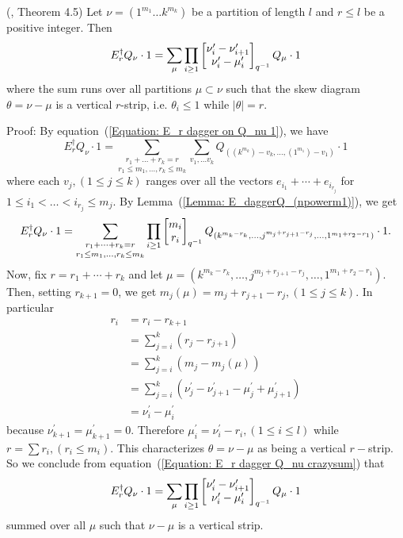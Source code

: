 \begin{dang}
    \begin{theorem}(\cite{jing2024characters}, Theorem 4.5)\label{Theorem: E_r dagger Q_nu explicit formula}
        Let $\nu=(1^{m_1}\dots k^{m_k})$ be a partition of length $l$ and $r\leq l$ be a positive integer. Then
        \begin{equation}
            E_r^\dagger Q_\nu\cdot1=\sum_{\mu}\prod_{i\geq1}\begin{bmatrix} \nu_i^\prime-\nu_{i+1}^\prime\\\nu_i^\prime-\mu_i^\prime\end{bmatrix}_{q^{-1}}Q_\mu\cdot1
        \end{equation}
        where the sum runs over all partitions $\mu\subset \nu$ such that the skew diagram $\theta=\nu-\mu$ is a vertical $r$-strip, i.e. $\theta_i\leq1$ while $|\theta|=r$.
    \end{theorem}
\end{dang}
Proof: By equation~(\ref{Equation: E_r dagger on Q_nu 1}), we have
\begin{equation}
        E_r^\dagger Q_\nu\cdot1 = \underset{r_1\leq m_1,\dots,r_k\leq m_k}{\sum_{r_1+\dots +r_k=r}} \sum_{v_1,\dots v_k}Q_{((k^{m_k})-v_k,\dots, (1^{m_1})-v_1)}\cdot1
\end{equation}
where each $v_j,(1\leq j\leq k)$ ranges over all the vectors $e_{i_1}+\cdots+e_{i_{r_j}}$ for $1\leq i_1<\dots<i_{r_j}\leq m_j$. By Lemma~(\ref{Lemma: E_daggerQ_(npowerm1)}), we get
\begin{equation}\label{Equation: E_r dagger Q_nu crazysum}
     E_r^\dagger Q_\nu\cdot1 = \underset{r_1\leq m_1,\dots,r_k\leq m_k}{\sum_{r_1+\dots +r_k=r}}\prod_{i\geq1}\begin{bmatrix} m_i\\r_i\end{bmatrix}_{q^{-1}}Q_{(k^{m_k-r_k},\dots,j^{m_j+r_{j+1}-r_j},\dots,1^{m_1+r_2-r_1})}\cdot1.
\end{equation}
Now, fix $r=r_1+\cdots+r_k$ and let $\mu=(k^{m_k-r_k},\dots,j^{m_j+r_{j+1}-r_j},\dots,1^{m_1+r_2-r_1})$. Then, setting $r_{k+1}=0$, we get $m_j(\mu)=m_j+r_{j+1}-r_j,(1\leq j\leq k)$. In particular
\begin{equation}
    \begin{split}
        r_i&=r_i-r_{k+1}\\
        &=\sum_{j=i}^k(r_j-r_{j+1})\\
        &=\sum_{j=i}^k(m_j-m_j(\mu))\\
        &=\sum_{j=i}^k(\nu_j^\prime-\nu_{j+1}^\prime-\mu_j^\prime+\mu_{j+1}^\prime)\\
        &=\nu_i^\prime -\mu_i^\prime
    \end{split}
\end{equation}
because $\nu_{k+1}^\prime=\mu_{k+1}^\prime=0$. Therefore $\mu_i^\prime=\nu_i^\prime-r_i,(1\leq i\leq l)$ while $r =\sum r_i, (r_i\leq m_i)$. This characterizes $\theta=\nu-\mu$ as being a vertical $r-$strip. So we conclude from equation~(\ref{Equation: E_r dagger Q_nu crazysum}) that 
\begin{equation}
      E_r^\dagger Q_\nu\cdot1=\sum_{\mu}\prod_{i\geq1}\begin{bmatrix} \nu_i^\prime-\nu_{i+1}^\prime\\\nu_i^\prime-\mu_i^\prime\end{bmatrix}_{q^{-1}}Q_\mu\cdot1
\end{equation}
summed over all $\mu$ such that $\nu-\mu$ is a vertical strip.
